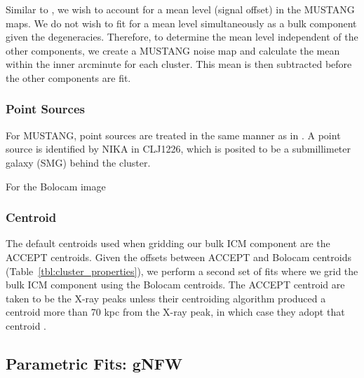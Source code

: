 \documentclass[iop,numberedappendix,apj]{emulateapj}
\begin{document}
Similar to \citet{czakon2015}, we wish to account for a mean level (signal offset) in the MUSTANG maps.
We do not wish to fit for a mean level simultaneously as a bulk component given the degeneracies. Therefore,
to determine the mean level independent of the other components, we create a MUSTANG noise map
and calculate the mean within the inner arcminute for each cluster. This mean is then subtracted before 
the other components are fit. 

\subsubsection{Point Sources}
\label{sec:ptsrcs}

For MUSTANG, point sources are treated in the same manner as in \citet{romero2015a}. 
A point source is identified by NIKA \citep{adam2015} in CLJ1226, which is posited to be a submillimeter galaxy (SMG) 
behind the cluster. 

For the Bolocam image

\subsubsection{Centroid}

The default centroids used when gridding our bulk ICM component are the ACCEPT centroids. Given the offsets
between ACCEPT and Bolocam centroids (Table~\ref{tbl:cluster_properties}), we perform a second set of
fits where we grid the bulk ICM component using the Bolocam centroids. The ACCEPT centroid are taken to be the
X-ray peaks unless their centroiding algorithm produced a centroid more than 70 kpc from the X-ray peak, in which
case they adopt that centroid \citep{cavagnolo2008a}. 

\subsection{Parametric Fits: gNFW}
\label{sec:parfits}
\end{document}

